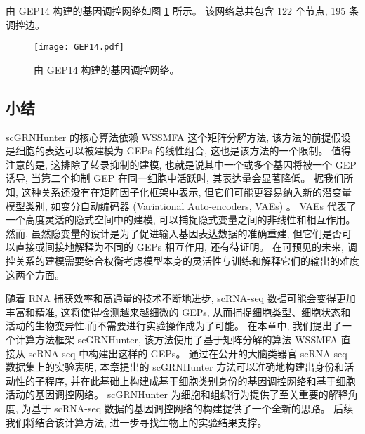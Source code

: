 由 GEP14 构建的基因调控网络如图 \ref{fig:gep-grn-gep14} 所示。
该网络总共包含 122 个节点, 195 条调控边。
\begin{figure}[!htbp]
    \centering
    \texttt{[image: GEP14.pdf]}
    \caption{由 GEP14 构建的基因调控网络。}
    \label{fig:gep-grn-gep14}
\end{figure}


\subsection{小结}
scGRNHunter 的核心算法依赖 WSSMFA 这个矩阵分解方法,
该方法的前提假设是细胞的表达可以被建模为 GEPs 的线性组合,
这也是该方法的一个限制。
值得注意的是, 这排除了转录抑制的建模, 也就是说其中一个或多个基因将被一个 GEP 诱导,
当第二个抑制 GEP 在同一细胞中活跃时, 其表达量会显著降低。
据我们所知, 这种关系还没有在矩阵因子化框架中表示, 但它们可能更容易纳入新的潜变量模型类别,
如变分自动编码器 (Variational Auto-encoders, VAEs) \cite{ding2018interpretable,gronbech2018scvae}。
VAEs 代表了一个高度灵活的隐式空间中的建模, 可以捕捉隐式变量之间的非线性和相互作用。
然而, 虽然隐变量的设计是为了促进输入基因表达数据的准确重建, 
但它们是否可以直接或间接地解释为不同的 GEPs 相互作用, 还有待证明。
在可预见的未来, 调控关系的建模需要综合权衡考虑模型本身的灵活性与训练和解释它们的输出的难度这两个方面。

随着 RNA 捕获效率和高通量的技术不断地进步, scRNA-seq 数据可能会变得更加丰富和精准,
这将使得检测越来越细微的 GEPs, 从而捕捉细胞类型、细胞状态和活动的生物变异性,而不需要进行实验操作成为了可能。
在本章中, 我们提出了一个计算方法框架 scGRNHunter,
该方法使用了基于矩阵分解的算法 WSSMFA 直接从 scRNA-seq 中构建出这样的 GEPs。 
通过在公开的大脑类器官 scRNA-seq 数据集上的实验表明,
本章提出的 scGRNHunter 方法可以准确地构建出身份和活动性的子程序, 
并在此基础上构建成基于细胞类别身份的基因调控网络和基于细胞活动的基因调控网络。
scGRNHunter 为细胞和组织行为提供了至关重要的解释角度,
为基于 scRNA-seq 数据的基因调控网络的构建提供了一个全新的思路。
后续我们将结合该计算方法, 进一步寻找生物上的实验结果支撑。